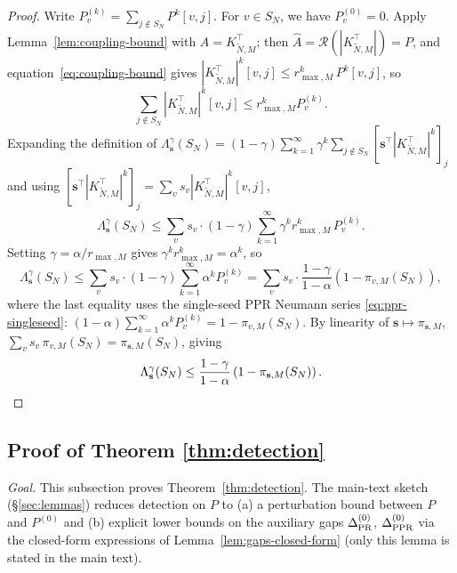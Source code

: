 \documentclass{article}
\theoremstyle{plain}
\theoremstyle{definition}
\def\tp{\intercal}
\begin{document}
\begin{proof}%
	Write $P_v^{(k)} = \sum_{j \notin S_N} P^k[v,j]$. For $v \in S_N$, we have $P_v^{(0)} = 0$. Apply Lemma~\ref{lem:coupling-bound} with $A = K_{\tilde{N},M}^\tp$; then $\hat A = \mathcal{R}(|K_{\tilde{N},M}^\tp|) = P$, and equation~\eqref{eq:coupling-bound} gives $|K_{\tilde{N},M}^\tp|^k[v,j] \leq r_{\max,M}^k\,P^k[v,j]$, so
	\begin{equation*}
		\sum_{j \notin S_N} |K_{\tilde{N},M}^\tp|^k[v,j] \leq r_{\max,M}^k P_v^{(k)}.
	\end{equation*}
	Expanding the definition of $\Lambda_{\mathbf{s}}^\gamma(S_N) = (1-\gamma)\sum_{k=1}^\infty \gamma^k \sum_{j \notin S_N}[\mathbf{s}^\tp |K_{\tilde{N},M}^\tp|^k]_j$ and using $[\mathbf{s}^\tp|K_{\tilde{N},M}^\tp|^k]_j = \sum_v s_v |K_{\tilde{N},M}^\tp|^k[v,j]$,
	\begin{equation*}
		\Lambda_{\mathbf{s}}^\gamma(S_N) \leq \sum_v s_v \cdot (1-\gamma)\sum_{k=1}^\infty \gamma^k r_{\max,M}^k\,P_v^{(k)}.
	\end{equation*}
	Setting $\gamma = \alpha/r_{\max,M}$ gives $\gamma^k r_{\max,M}^k = \alpha^k$, so
	\begin{equation*}
		\Lambda_{\mathbf{s}}^\gamma(S_N) \leq \sum_v s_v \cdot (1-\gamma)\sum_{k=1}^\infty \alpha^k P_v^{(k)} = \sum_v s_v \cdot \frac{1-\gamma}{1-\alpha}(1 - \pi_{v,M}(S_N)),
	\end{equation*}
	where the last equality uses the single-seed PPR Neumann series \eqref{eq:ppr-singleseed}: $(1-\alpha)\sum_{k=1}^\infty \alpha^k P_v^{(k)} = 1 - \pi_{v,M}(S_N)$. By linearity of $\mathbf{s} \mapsto \pi_{\mathbf{s}, M}$, $\sum_v s_v\,\pi_{v,M}(S_N) = \pi_{\mathbf{s}, M}(S_N)$, giving
	\begin{equation*}
		\Lambda_{\mathbf{s}}^\gamma(S_N) \leq \frac{1-\gamma}{1-\alpha}\left(1 - \pi_{\mathbf{s}, M}(S_N)\right). \qedhere
	\end{equation*}
\end{proof}

\subsection{Proof of Theorem \ref{thm:detection}}\label{sec:detection_proofs}

\emph{Goal.} This subsection proves Theorem~\ref{thm:detection}. The main-text sketch (\S\ref{sec:lemmas}) reduces detection on $P$ to (a) a perturbation bound between $P$ and $P^{(0)}$ and (b) explicit lower bounds on the auxiliary gaps $\Delta^{(0)}_{\textnormal{PR}}$, $\Delta^{(0)}_{\textnormal{PPR}}$ via the closed-form expressions of Lemma~\ref{lem:gaps-closed-form} (only this lemma is stated in the main text).
\end{document}
